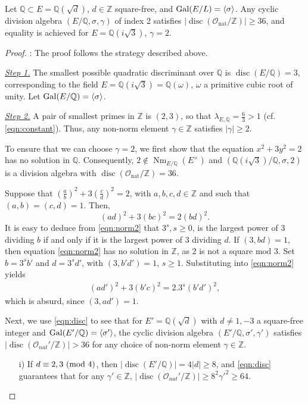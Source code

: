 \documentclass[smallextended]{svjour3}
\def\zmod#1{\,\,({\rm mod}\,\,#1)}
\newcommand{\Q}{\mathbb{Q}}
\newcommand{\Z}{\mathbb{Z}}
\newcommand{\G}{{\rm Gal}}
\newcommand{\Or}{\mathcal{O}}
\DeclareMathOperator{\Nm}{Nm}
\DeclareMathOperator{\nat}{nat}
\DeclareMathOperator{\disc}{disc}
\begin{document}
\begin{theorem} 
\label{thm:res1}
Let $ \Q \subset E = \Q(\sqrt{d})$, $d \in \Z$ square-free, and $\G(E/L)=\langle \sigma \rangle$. Any cyclic division algebra $\left(E/\Q, \sigma, \gamma\right)$ of index 2 satisfies 
$|\disc(\Or_{\nat}/\Z)| \ge 36$, and equality is achieved for $E = \Q(i\sqrt{3})$, $\gamma = 2$.
\end{theorem}

\begin{proof}: The proof follows the strategy described above. 
\medskip

\noindent\emph{\underline{Step 1.}} 
The smallest possible quadratic discriminant over $\Q$ is $\disc(E/\mathbb{Q}) = 3$, corresponding to the field $E = \Q(i\sqrt{3}) = \Q(\omega)$,  $\omega$ a primitive cubic root of unity. Let $\G(E/\Q) = \langle \sigma \rangle$. 
\medskip

\noindent\emph{\underline{Step 2.}}  
A pair of smallest primes in $\Z$ is $(2,3)$, so that $\lambda_{E, \Q} = \frac{6}{3} > 1$  (cf. \eqref{eqn:constant}). Thus, any non-norm element $\gamma \in \Z$ satisfies $|\gamma | \ge 2$. 

To ensure that we can choose $\gamma = 2$, we first show that the equation $x^2+3y^2=2$ has no solution in $\Q$. Consequently, $2\not \in \Nm_{E/\Q}(E^{\times})$ and $(\Q(i\sqrt{3})/\Q, \sigma, 2)$ is a division algebra with  $\disc(\Or_{\nat}/\Z) = 36$.

Suppose that $\left(\frac{a}{b}\right)^2+3 \left(\frac{c}{d}\right )^2 = 2$, with  $a, b, c, d\in \Z$ and such that $(a,b) = (c,d) = 1$. Then,
\begin{equation}
\label{eqn:norm2}
	(ad)^2+3(bc)^2=2(bd)^2. 
\end{equation}
It is easy to deduce from \eqref{eqn:norm2} that $3^s, s \ge 0$, is the largest power of 3 dividing $b$ if and only if it is the largest power of $3$ dividing $d$. If $(3,bd) = 1$, then equation \eqref{eqn:norm2} has no solution in $\Z$, as 2 is not a square $\mathrm{mod}$ 3. Set $b = 3^sb'$ and $d = 3^sd'$, with $(3,b'd') = 1$, $s\ge 1$. Substituting into \eqref{eqn:norm2} yields
\begin{align*}
	(ad')^2+3(b'c)^2=2.3^s(b'd')^2,
\end{align*}
which is absurd, since $(3,ad') = 1$.

Next, we use \eqref{eqn:disc} to see that for $E' = \Q(\sqrt d)$ with $d \ne 1, -3$ a square-free integer and $\G(E'/\Q) = \langle \sigma '\rangle$, the cyclic division algebra $\left(E'/\Q, \sigma', \gamma'\right)$ satisfies $ |\disc(\Or_{nat}'/\Z)|>36$ for any choice of non-norm element $\gamma\in \Z$.
\begin{itemize}
	\item[i)] If $d\equiv 2,3 \zmod 4$, then $|\disc(E'/\Q)|=4|d| \ge 8$,
	and \eqref{eqn:disc} guarantees that  for any  $\gamma' \in \Z$, $|\disc (\Or_{nat}'/\Z)|\ge 8^2\gamma'^2\ge 64$.


\end{itemize}
\end{proof}
\end{document}

